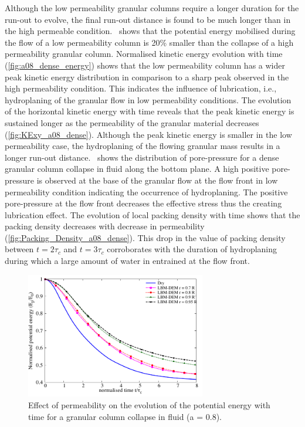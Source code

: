 Although the low permeability granular columns require a longer duration for 
the run-out to evolve, the final run-out distance is found to be much longer 
than in the high permeable condition.~ shows that the 
potential energy mobilised during the flow of a low permeability column is 20\% 
smaller than the collapse of a high permeability granular column. Normalised 
kinetic energy evolution with time (\cref{fig:a08_dense_energy}) shows that the 
low permeability column has a wider peak kinetic energy distribution in 
comparison to a sharp peak observed in the high permeability condition. This 
indicates the influence of lubrication, i.e., hydroplaning of the granular flow 
in low permeability conditions. The evolution of the horizontal kinetic energy 
with time reveals that the peak kinetic energy is sustained longer as the 
permeability of the granular material decreases (\cref{fig:KExy_a08_dense}). 
Although the peak kinetic energy is smaller in the low permeability case, the 
hydroplaning of the flowing granular mass results in a longer run-out 
distance.~ shows the 
distribution of pore-pressure for a dense granular column collapse in fluid 
along the bottom plane. A high positive pore-pressure is observed 
at the base of the granular flow at the flow front in low permeability 
condition indicating the occurrence of hydroplaning. The positive pore-pressure 
at the flow front decreases the effective stress thus the creating lubrication 
effect. The evolution of local packing density with time shows that the packing 
density decreases with decrease in permeability 
(\cref{fig:Packing_Density_a08_dense}). This drop 
in the value of packing density between $t = 2\tau_c$ and $t=3\tau_c$ 
corroborates with the duration of hydroplaning during which a large amount of 
water in entrained at the flow front.

\begin{figure}
	\centering
    \includegraphics[width=0.7\textwidth]{PE_a08_dense}
    \caption{Effect of permeability on the evolution of the potential energy 
    with time for a granular column collapse in fluid (a = 0.8).}
    \label{fig:PE_a08_dense}
\end{figure}


